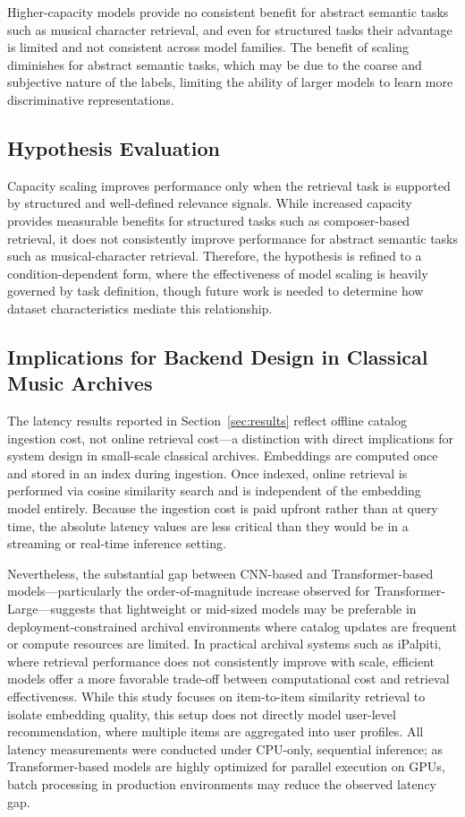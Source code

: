 \documentclass{article}
\begin{document}
Higher-capacity models provide no consistent benefit for abstract semantic tasks such as musical character retrieval, and even for structured tasks their advantage is limited and not consistent across model families. The benefit of scaling diminishes for abstract semantic tasks, which may be due to the coarse and subjective nature of the labels, limiting the ability of larger models to learn more discriminative representations.

\subsection{Hypothesis Evaluation}

Capacity scaling improves performance only when the retrieval task is supported by structured and well-defined relevance signals. While increased capacity provides measurable benefits for structured tasks such as composer-based retrieval, it does not consistently improve performance for abstract semantic tasks such as musical-character retrieval. Therefore, the hypothesis is refined to a condition-dependent form, where the effectiveness of model scaling is heavily governed by task definition, though future work is needed to determine how dataset characteristics mediate this relationship.

\subsection{Implications for Backend Design in Classical Music Archives}

The latency results reported in Section~\ref{sec:results} reflect offline catalog ingestion cost, not online retrieval cost---a distinction with direct implications for system design in small-scale classical archives. Embeddings are computed once and stored in an index during ingestion. Once indexed, online retrieval is performed via cosine similarity search and is independent of the embedding model entirely. Because the ingestion cost is paid upfront rather than at query time, the absolute latency values are less critical than they would be in a streaming or real-time inference setting.

Nevertheless, the substantial gap between CNN-based and Transformer-based models---particularly the order-of-magnitude increase observed for Transformer-Large---suggests that lightweight or mid-sized models may be preferable in deployment-constrained archival environments where catalog updates are frequent or compute resources are limited. In practical archival systems such as iPalpiti, where retrieval performance does not consistently improve with scale, efficient models offer a more favorable trade-off between computational cost and retrieval effectiveness. While this study focuses on item-to-item similarity retrieval to isolate embedding quality, this setup does not directly model user-level recommendation, where multiple items are aggregated into user profiles. All latency measurements were conducted under CPU-only, sequential inference; as Transformer-based models are highly optimized for parallel execution on GPUs, batch processing in production environments may reduce the observed latency gap.
\end{document}
